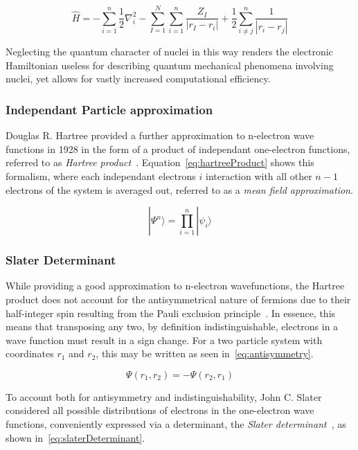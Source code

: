\documentclass[12pt]{article}
\begin{document}
\begin{equation}
  \hat{H} = -\sum_{i=1}^{n}\frac{1}{2}\nabla_i^2 -\sum_{I=1}^{N}\sum_{i=1}^{n}\frac{Z_I}{|r_I - r_i|} + \frac{1}{2}\sum_{i\neq j}^{n}\frac{1}{|r_i - r_j|}  \label{eq:electricHamiltonian}
\end{equation}

\bigskip

\noindent Neglecting the quantum character of nuclei in this way renders the electronic Hamiltonian useless for describing quantum mechanical phenomena involving nuclei, yet allows for vastly increased computational efficiency.

\subsubsection{Independant Particle approximation}
Douglas R. Hartree provided a further approximation to n-electron wave functions in 1928 in the form of a product of independant one-electron functions, referred to as \textit{Hartree product}~\cite{Hartree1928}.
Equation~\ref{eq:hartreeProduct} shows this formalism, where each independant electrons $i$ interaction with all other $n-1$ electrons of the system is averaged out, referred to as a \textit{mean field approximation}.

\begin{equation}
  |\Psi^{n}\rangle = \prod_{i=1}^{n}|\psi_i\rangle
  \label{eq:hartreeProduct}
\end{equation}

\subsubsection{Slater Determinant}
While providing a good approximation to n-electron wavefunctions, the Hartree product does not account for the antisymmetrical nature of fermions due to their half-integer spin resulting from the Pauli exclusion principle~\cite{Pauli1925}.
In essence, this means that transposing any two, by definition indistinguishable, electrons in a wave function must result in a sign change. For a two particle system with coordinates $r_1$ and $r_2$, this may be written as seen in~\ref{eq:antisymmetry}.

\begin{equation}
  \Psi(r_1, r_2) = -\Psi(r_2, r_1)
  \label{eq:antisymmetry}
\end{equation}

\bigskip

\noindent To account both for antisymmetry and indistinguishability, John C. Slater considered all possible distributions of electrons in the one-electron wave functions, conveniently expressed via a determinant, the \textit{Slater determinant}~\cite{Slater1929}, as shown in~\ref{eq:slaterDeterminant}.
\end{document}
